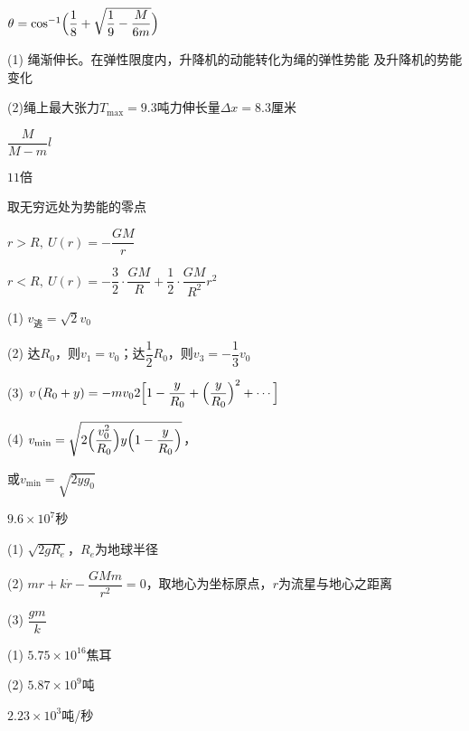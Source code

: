 \clearpage
\answer $ \theta = \cos ^ { - 1 } \Bigl( \dfrac { 1 } { 8 } + \sqrt { \dfrac { 1 } { 9 } - \dfrac { M } { 6 m } } \Bigr) $

\answer (1) 绳渐伸长。在弹性限度内，升降机的动能转化为绳的弹性势能
及升降机的势能变化

(2)绳上最大张力$ T_\text{max}=9.3 $吨力伸长量$ \Delta x = 8 . 3 $厘米

\answer $ \dfrac { M } { M - m } l $

\answer $ 11 $倍

\answer 取无穷远处为势能的零点

$ r > R,~ U \left( r \right) = - \dfrac { G M } { r }$

$ r < R,~ U \left( r \right) = - \dfrac { 3 } { 2 } \cdot \dfrac { G M } { R } + \dfrac { 1 } { 2 } \cdot \dfrac { G M } { R ^ { 2 } } r ^ { 2 } $

\answer (1) $ v _ \text{逃} = \sqrt { 2 } v _ { 0 } $

(2) 达$ R_0 $，则$ v _ { 1 } = v _ { 0 } $；达$ \dfrac { 1 } { 2 } R _ { 0 } $，则$ v _ { 3 } = - \dfrac { 1 } { 3 } v _ { 0 } $

(3) $v\left(R_{0}+y\right)=-m v_{0} 2\Bigl[1-\dfrac{y}{R_{0}}+\Bigl(\dfrac{y}{R_{0}}\Bigr)^{2}+\cdots\Bigr]$

(4) $v_{\text{min}}=\sqrt{2\Bigl(\dfrac{v_{0}^{2}}{R_{0}}\Bigr) y\Bigl(1-\dfrac{y}{R_{0}}\Bigr)}$，

或$v_{\text{min}} = \sqrt { 2 y g _ { 0 } } $

\answer $ 9 . 6 \times 1 0 ^ { 7 } $秒

\answer (1) $ \sqrt { 2 g R _ { e } } $，$ R_e $为地球半径

(2) $ m r + k \dot{r} - \dfrac { G M m } { r ^ { 2 } } = 0 $，取地心为坐标原点，$ r $为流星与地心之距离

(3) $ \dfrac{g m}{k} $

\answer (1) $ 5 . 7 5 \times 1 0 ^ { 16 } $焦耳

(2) $ 5.87\times 10 ^9 $吨

\answer $ 2 . 2 3 \times 1 0 ^ { 3 } $吨/秒
